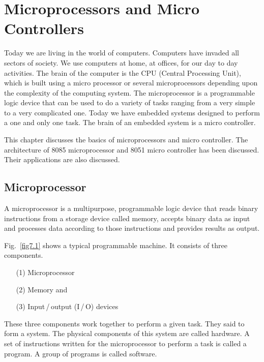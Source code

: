 \chapter{Microprocessors and Micro Controllers}\label{chap7}

Today we are living in the world of computers. Computers have invaded all sectors of society. We use computers at home, at offices, for our day to day activities. The brain of the computer is the CPU (Central Processing Unit), which is built using a micro processor or several microprocessors depending upon the complexity of the computing system. The microprocessor is a programmable logic device that can be used to do a variety of tasks ranging from a very simple to a very complicated one. Today we have embedded systems designed to perform a one and only one task. The brain of an embedded system is a micro controller. 

This chapter discusses the basics of microprocessors and micro controller. The architecture of 8085 microprocessor and 8051 micro controller has been discussed. Their applications are also discussed.

\section{Microprocessor}\label{sec7.1}

A microprocessor is a multipurpose, programmable logic device that reads binary instructions from a storage device called memory, accepts binary data as input and processes data according to those instructions and provides results as output.

Fig.~\ref{fig7.1} shows a typical programmable machine. It consists of three components.
\begin{itemize}
\item[(1)] Microprocessor

\item[(2)] Memory and

\item[(3)] Input\,/\,output (I\,/\,O) devices
\end{itemize}

These three components work together to perform a given task. They said to form a system. The physical components of this system are called hardware. A set of instructions written for the microprocessor to perform a task is called a program. A group of programs is called software.


